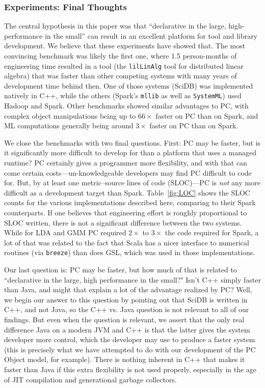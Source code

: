 \subsubsection{Experiments: Final Thoughts}

The central hypothesis in this paper was that ``declarative in the large, high-performance in the small'' can result
in an excellent platform for tool and library development.  We believe that these experiments have showed that.  The
most convincing benchmark was likely the first one, where 1.5 person-months of engineering time resulted in a tool
(the \texttt{lilLinAlg} tool for distributed linear algebra) that 
was faster than other competing systems with many years of development time behind then.  One of those systems (SciDB)
was implemented natively in C++, while the others (Spark's \texttt{mllib} as well as \texttt{SystemML}) used Hadoop and Spark.  
Other benchmarks showed similar advantages to PC, with complex object manipulations being 
up to $66 \times$ faster on PC than on Spark, and ML computations generally being around $3 \times$ faster on PC than on Spark.

We close the benchmarks with two final questions.  First: PC may be faster, but is it significantly more difficult to develop
for than a platform that uses a managed runtime?  PC certainly gives a programmer more flexibility, and with that can come
certain costs---un-knowledgeable developers may find PC difficult to code for.  But, by at least one metric--source
lines of code (SLOC)---PC is \emph{not}
any more difficult as a development target than Spark.
Table~\ref{fig:LOC} shows the SLOC counts for the various implementations described here, comparing to their Spark counterparts.
If one believes that engineering effort is roughly proportional to SLOC written, there is not a significant
difference between the two
systems.  
While for LDA and GMM PC required $2\times$ to $3\times$ the code required for Spark, a lot of that was related
to the fact that Scala has a nicer interface to numerical routines (via \texttt{breeze}) 
than does GSL, which was used in those
implementations.

Our last question is: PC may be faster, but how much of that is related to ``declarative in the large, high performance in 
the small?"   Isn't C++ simply faster than Java, and might that explain a lot of the advantage realized by PC?  Well, we begin
our answer to this question by pointing out that SciDB is written in C++, and not Java, so the C++ vs. Java question is not 
relevant to all of our findings.
But even when the question is relevant, we assert that the only real difference Java on a modern JVM and C++ is that the latter
gives the system developer more control, which the developer may use to produce a faster system (this is precisely
what we have attempted to do with our development of the PC Object model, for example).  
There is nothing inherent in C++ that makes it faster than Java if this extra flexibility is not used properly, 
especially in the age of
JIT compilation and generational garbage collectors.  

